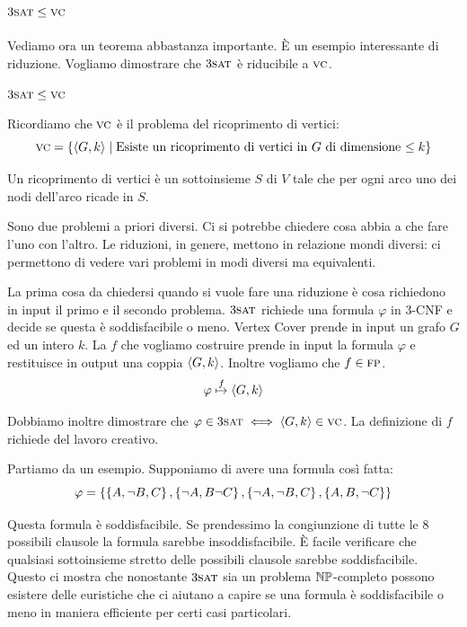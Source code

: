 \subsection{$3\textsc{sat} \leq \textsc{vc}$}

Vediamo ora un teorema abbastanza importante. È un esempio interessante di riduzione. Vogliamo
dimostrare che $3\textsc{sat}$ è riducibile a $\textsc{vc}$.

\begin{thm}
        $3\textsc{sat} \leq \textsc{vc}$
\end{thm}

Ricordiamo che $\textsc{vc}$ è il problema del ricoprimento di vertici:
\begin{equation*}
    \textsc{vc} = \left\{\langle G, k \rangle \mid \text{Esiste un ricoprimento di vertici in $G$ di dimensione $\leq k$}\right\}
\end{equation*}

Un ricoprimento di vertici è un sottoinsieme $S$ di $V$ tale che per ogni arco uno dei nodi
dell'arco ricade in $S$.

Sono due problemi a priori diversi. Ci si potrebbe chiedere cosa abbia a che fare l'uno con l'altro.
Le riduzioni, in genere, mettono in relazione mondi diversi: ci permettono di vedere vari problemi
in modi diversi ma equivalenti.

La prima cosa da chiedersi quando si vuole fare una riduzione è cosa richiedono in input il primo e
il secondo problema. $3\textsc{sat}$ richiede una formula $\varphi$ in 3-CNF e decide se questa è
soddisfacibile o meno. Vertex Cover prende in input un grafo $G$ ed un intero $k$. La $f$ che
vogliamo costruire prende in input la formula $\varphi$ e restituisce in output una coppia
$\langle G, k \rangle$. Inoltre vogliamo che $f \in \textsc{fp}$.
\begin{equation*}
    \varphi \overset{f}{\mapsto} \langle G, k \rangle
\end{equation*}

Dobbiamo inoltre dimostrare che $\varphi \in 3\textsc{sat} \iff \langle G, k \rangle \in \textsc{vc}$. La definizione di $f$
richiede del lavoro creativo.

Partiamo da un esempio. Supponiamo di avere una formula così fatta:
\begin{equation*}
    \varphi = \left\{\left\{A,\lnot B, C\right\},\left\{\lnot A, B \lnot C\right\},\left\{\lnot A,\lnot B, C\right\},\left\{A,B,\lnot
    C\right\}\right\}
\end{equation*}

Questa formula è soddisfacibile. Se prendessimo la congiunzione di tutte le 8 possibili clausole la
formula sarebbe insoddisfacibile. È facile verificare che qualsiasi sottoinsieme stretto delle
possibili clausole sarebbe soddisfacibile. Questo ci mostra che nonostante $3\textsc{sat}$ sia un problema
$\mathbb{NP}$-completo possono esistere delle euristiche che ci aiutano a capire se una formula è
soddisfacibile o meno in maniera efficiente per certi casi particolari.

